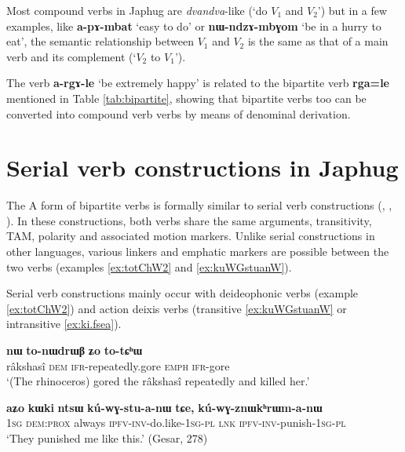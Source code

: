 \documentclass[oneside,a4paper,11pt]{article}
\newcommand{\ipa}[1]{{\phon\textbf{#1}}}
\newcommand{\jpg}[2]{\ipa{#1} `#2'}
\begin{document}
Most compound verbs in Japhug are \textit{dvandva}-like (`do $V_1$ and $V_2$')  but in a few examples, like \jpg{a-pɤ-mbat}{easy to do} or \jpg{nɯ-ndzɤ-mbɣom}{be in a hurry to eat}, the semantic relationship between $V_1$  and $V_2$ is the same as that of a main verb and its complement (`$V_2$ to $V_1$').

The verb \jpg{a-rgɤ-le}{be extremely happy} is related to the bipartite verb \ipa{rga=le} mentioned in Table \ref{tab:bipartite}, showing that bipartite verbs too can be converted into compound verb verbs by means of denominal derivation.

\section{Serial verb constructions in Japhug} \label{sec:serial}
The A form of bipartite verbs is formally similar to serial verb constructions (\citealt{sun12complementation}, \citealt{jacques13harmonization}, \citealt{jacques16complementation}). In these constructions, both verbs share the same arguments, transitivity, TAM, polarity and associated motion markers. Unlike serial constructions in other languages, various linkers and emphatic markers are possible between the two verbs (examples \ref{ex:totChW2} and \ref{ex:kuWGstuanW}).

Serial verb constructions mainly occur with deideophonic verbs (example \ref{ex:totChW2}) and action deixis verbs (transitive \ref{ex:kuWGstuanW} or intransitive \ref{ex:ki.fsea}).

\begin{exe}
\ex \label{ex:totChW2}
\gll 	\ipa{srɯnmɯ} 	\ipa{nɯ} 	\ipa{to-nɯdrɯβ} 	\ipa{ʑo} 	 	\ipa{to-tɕʰɯ} \\
 râkshasî \textsc{dem}  \textsc{ifr}-repeatedly.gore  \textsc{emph}  \textsc{ifr}-gore \\
 \glt `(The rhinoceros) gored the râkshasî repeatedly and killed her.' 
\end{exe}	

\begin{exe}
\ex \label{ex:kuWGstuanW}
\gll 	
 \ipa{aʑo} 	\ipa{kɯki} 	\ipa{ntsɯ} 	\ipa{kú-wɣ-stu-a-nɯ} 	\ipa{tɕe,} 	\ipa{kú-wɣ-znɯkʰrɯm-a-nɯ} \\
 \textsc{1sg} \textsc{dem:prox} always \textsc{ipfv-inv}-do.like-\textsc{1sg-pl} \textsc{lnk} \textsc{ipfv-inv}-punish-\textsc{1sg-pl} \\
 \glt `They punished me like this.' (Gesar, 278)
\end{exe}	
\end{document}
